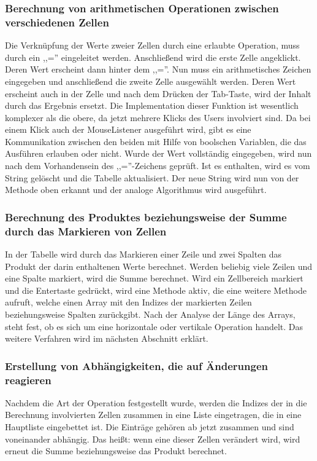 \documentclass[12pt]{report}
\begin{document}
\subsubsection{Berechnung von arithmetischen Operationen zwischen verschiedenen Zellen}
Die Verknüpfung der Werte zweier Zellen durch eine erlaubte Operation, muss durch ein ,,='' eingeleitet werden. Anschließend wird die erste Zelle angeklickt. Deren Wert erscheint dann hinter dem ,,=''. Nun muss ein arithmetisches Zeichen eingegeben und anschließend die zweite Zelle ausgewählt werden. Deren Wert erscheint auch in der Zelle und nach dem Drücken der Tab-Taste, wird der Inhalt durch das Ergebnis ersetzt. Die Implementation dieser Funktion ist wesentlich komplexer als die obere, da jetzt mehrere Klicks des Users involviert sind. Da bei einem Klick auch der MouseListener ausgeführt wird, gibt es eine Kommunikation zwischen den beiden mit Hilfe von boolschen Variablen, die das Ausführen erlauben oder nicht. Wurde der Wert vollständig eingegeben, wird nun nach dem Vorhandensein des ,,=''-Zeichens geprüft. Ist es enthalten, wird es vom String gelöscht und die Tabelle aktualisiert. Der neue String wird nun von der Methode oben erkannt und der analoge Algorithmus wird ausgeführt.


\subsubsection{Berechnung des Produktes beziehungsweise der Summe durch das Markieren von Zellen}
In der Tabelle wird durch das Markieren einer Zeile und zwei Spalten das Produkt der darin enthaltenen Werte berechnet. Werden beliebig viele Zeilen und eine Spalte markiert, wird die Summe berechnet. Wird ein Zellbereich markiert und die Entertaste gedrückt, wird eine Methode aktiv, die eine weitere Methode aufruft, welche einen Array mit den Indizes der markierten Zeilen beziehungsweise Spalten zurückgibt. Nach der Analyse der Länge des Arrays, steht fest, ob es sich um eine horizontale oder vertikale Operation handelt. Das weitere Verfahren wird im nächsten Abschnitt erklärt. 


\subsubsection{Erstellung von Abhängigkeiten, die auf Änderungen reagieren}
Nachdem die Art der Operation festgestellt wurde, werden die Indizes der in die Berechnung involvierten Zellen zusammen in eine Liste eingetragen, die in eine Hauptliste eingebettet ist. Die Einträge gehören ab jetzt zusammen und sind voneinander abhängig. Das heißt: wenn eine dieser Zellen verändert wird, wird erneut die Summe beziehungsweise das Produkt berechnet.
\end{document}
